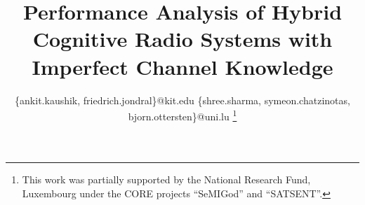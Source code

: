 \documentclass[conference, twocolumn]{IEEEtran}
\begin{document}
%
\title{Performance Analysis of Hybrid Cognitive Radio Systems with Imperfect Channel Knowledge}
\author{
\{ankit.kaushik, friedrich.jondral\}@kit.edu
\{shree.sharma, symeon.chatzinotas, bjorn.ottersten\}@uni.lu
\thanks{This work was partially supported by the National Research Fund, Luxembourg under the CORE projects ``SeMIGod'' and ``SATSENT''.}
}

\maketitle
\thispagestyle{empty}
\pagestyle{empty}






\end{document}

